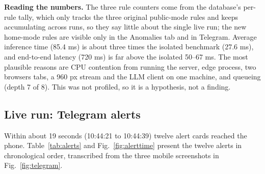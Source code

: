 \documentclass[11pt]{article}
\begin{document}
\textbf{Reading the numbers.} The three rule counters come from the database's per-rule tally, which only tracks the three original public-mode rules and keeps accumulating across runs, so they say little about the single live run; the new home-mode rules are visible only in the Anomalies tab and in Telegram. Average inference time (85.4 ms) is about three times the isolated benchmark (27.6 ms), and end-to-end latency (720 ms) is far above the isolated 50--67 ms. The most plausible reasons are CPU contention from running the server, edge process, two browsers tabs, a 960 px stream and the LLM client on one machine, and queueing (depth 7 of 8). This was not profiled, so it is a hypothesis, not a finding.

\subsection{Live run: Telegram alerts}

Within about 19 seconds (10:44:21 to 10:44:39) twelve alert cards reached the phone. Table~\ref{tab:alerts} and Fig.~\ref{fig:alerttime} present the twelve alerts in chronological order, transcribed from the three mobile screenshots in Fig.~\ref{fig:telegram}.
\end{document}
